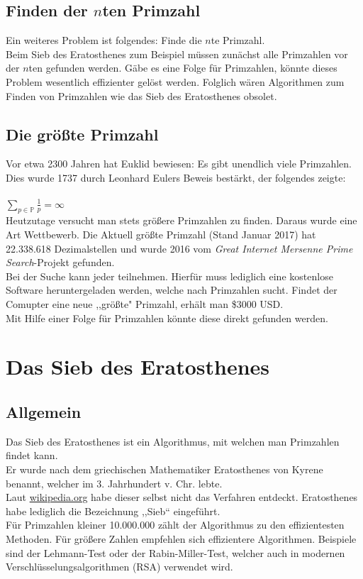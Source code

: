 \documentclass[a4paper,12pt]{article}
\begin{document}
\subsection{Finden der $n$ten Primzahl}
Ein weiteres Problem ist folgendes: Finde die $n$te Primzahl.\\ Beim Sieb des Eratosthenes zum Beispiel müssen zunächst alle Primzahlen vor der $n$ten gefunden werden. Gäbe es eine Folge für Primzahlen, könnte dieses Problem wesentlich effizienter gelöst werden. Folglich wären Algorithmen zum Finden von Primzahlen wie das Sieb des Eratosthenes obsolet.

\subsection{Die größte Primzahl}
Vor etwa 2300 Jahren hat Euklid bewiesen: Es gibt unendlich viele Primzahlen. Dies wurde 1737 durch Leonhard Eulers Beweis bestärkt, der folgendes zeigte:\\\\
\indent $\sum_{p\in\mathbb{P}}{\frac{1}{p}} = \infty$\\

\noindent Heutzutage versucht man stets größere Primzahlen zu finden. Daraus wurde eine Art Wettbewerb.
Die Aktuell größte Primzahl (Stand Januar 2017)  hat 22.338.618 Dezimalstellen und wurde 2016 vom \emph{Great Internet Mersenne Prime Search}-Projekt gefunden.\\
Bei der Suche kann jeder teilnehmen. Hierfür muss lediglich eine kostenlose Software heruntergeladen werden, welche nach Primzahlen sucht. Findet der Comupter eine neue ,,größte" Primzahl, erhält man \$3000 USD.\\
Mit Hilfe einer Folge für Primzahlen könnte diese direkt gefunden werden.



\newpage{}


\section{Das Sieb des Eratosthenes}
\subsection{Allgemein}
Das Sieb des Eratosthenes ist ein Algorithmus, mit welchen man Primzahlen findet kann. \\Er wurde
nach dem griechischen Mathematiker Eratosthenes von Kyrene benannt, welcher im 3. Jahrhundert v. Chr. lebte. \\Laut \href{https://de.wikipedia.org/wiki/Sieb_des_Eratosthenes}{wikipedia.org} habe dieser selbst nicht das Verfahren entdeckt. Eratosthenes habe lediglich die Bezeichnung ,,Sieb“ eingeführt.\\
Für Primzahlen kleiner 10.000.000 zählt der Algorithmus zu den effizientesten Methoden. Für größere Zahlen empfehlen sich effizientere Algorithmen. Beispiele sind der Lehmann-Test oder der Rabin-Miller-Test, welcher auch in modernen Verschlüsselungsalgorithmen (RSA) verwendet wird.
\end{document}
